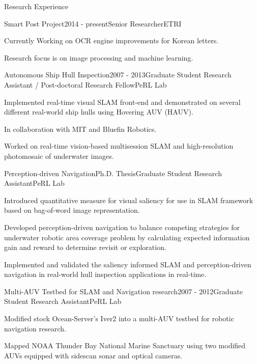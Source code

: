 \begin{rSection}{Research Experience}

\begin{rSubsection}{Smart Post Project}{2014 - present}{Senior Researcher}{ETRI}
  \item Currently Working on \ac{OCR} engine improvements for Korean letters.
  \item Research focus is on image processing and machine learning. 
\end{rSubsection}

\begin{rSubsection}{Autonomous Ship Hull Inspection}{2007 - 2013}{Graduate Student Research Assistant / Post-doctoral Research Fellow}{PeRL Lab}
  \item Implemented real-time visual SLAM front-end and demonstrated on several different real-world ship hulls using Hovering \ac{AUV} (HAUV).
  \item In collaboration with \ac{MIT} and Bluefin Robotics.
  \item Worked on real-time vision-based multisession SLAM and high-resolution photomosaic of underwater images.
\end{rSubsection}

\begin{rSubsection}{Perception-driven Navigation}{Ph.D. Thesis}{Graduate Student Research Assistant}{PeRL Lab}
  \item Introduced quantitative measure for visual saliency for use in SLAM framework based on bag-of-word image representation.
  \item Developed perception-driven navigation to balance competing strategies for underwater robotic area coverage problem by calculating expected information gain and reward to determine revisit or exploration.
  \item Implemented and validated the saliency informed SLAM and perception-driven navigation in real-world hull inspection applications in real-time.
\end{rSubsection}

\begin{rSubsection}{Multi-AUV Testbed for SLAM and Navigation research}{2007 - 2012}{Graduate Student Research Assistant}{PeRL Lab}
  \item Modified stock Ocean-Server's Iver2 into a multi-AUV testbed for robotic navigation research.
  \item Mapped \ac{NOAA} Thunder Bay National Marine Sanctuary using two modified AUVs equipped with sidescan sonar and optical cameras.
\end{rSubsection}


\end{rSection}
